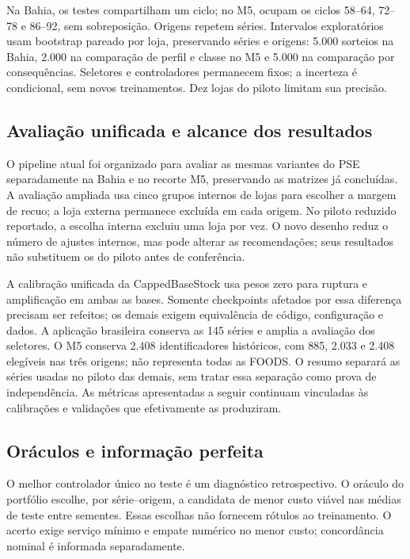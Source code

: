 \documentclass[preprint,12pt]{elsarticle}
\begin{document}
Na Bahia, os testes compartilham um ciclo; no M5, ocupam os ciclos 58--64, 72--78 e 86--92, sem sobreposição. Origens repetem séries. Intervalos exploratórios usam bootstrap pareado por loja, preservando séries e origens: 5.000 sorteios na Bahia, 2.000 na comparação de perfil e classe no M5 e 5.000 na comparação por consequências. Seletores e controladores permanecem fixos; a incerteza é condicional, sem novos treinamentos. Dez lojas do piloto limitam sua precisão.

\subsection{Avaliação unificada e alcance dos resultados}
O pipeline atual foi organizado para avaliar as mesmas variantes do PSE separadamente na Bahia e no recorte M5, preservando as matrizes já concluídas. A avaliação ampliada usa cinco grupos internos de lojas para escolher a margem de recuo; a loja externa permanece excluída em cada origem. No piloto reduzido reportado, a escolha interna excluiu uma loja por vez. O novo desenho reduz o número de ajustes internos, mas pode alterar as recomendações; seus resultados não substituem os do piloto antes de conferência.

A calibração unificada da CappedBaseStock usa pesos zero para ruptura e amplificação em ambas as bases. Somente checkpoints afetados por essa diferença precisam ser refeitos; os demais exigem equivalência de código, configuração e dados. A aplicação brasileira conserva as 145 séries e amplia a avaliação dos seletores. O M5 conserva 2.408 identificadores históricos, com 885, 2.033 e 2.408 elegíveis nas três origens; não representa todas as FOODS. O resumo separará as séries usadas no piloto das demais, sem tratar essa separação como prova de independência. As métricas apresentadas a seguir continuam vinculadas às calibrações e validações que efetivamente as produziram.

\subsection{Oráculos e informação perfeita}
O melhor controlador único no teste é um diagnóstico retrospectivo. O oráculo do portfólio escolhe, por série--origem, a candidata de menor custo viável nas médias de teste entre sementes. Essas escolhas não fornecem rótulos ao treinamento. O acerto exige serviço mínimo e empate numérico no menor custo; concordância nominal é informada separadamente.
\end{document}
